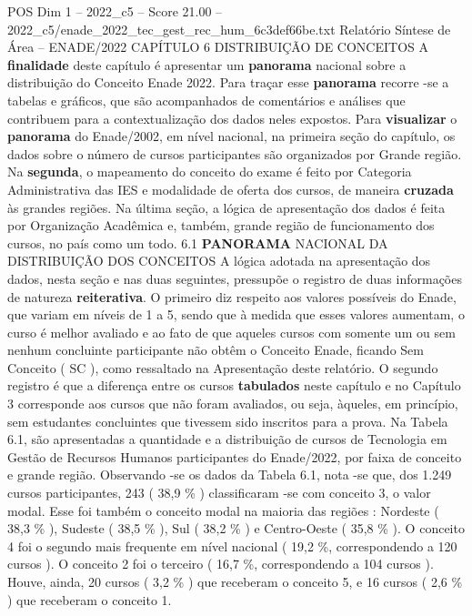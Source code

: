 \begin{textsample}{POS Dim 1 – 2022\_c5 – Score 21.00 – 2022\_c5/enade\_2022\_tec\_gest\_rec\_hum\_6c3def66be.txt}  \label{ex:f1_pos_022}
Relatório Síntese de Área – ENADE/2022 CAPÍTULO 6 DISTRIBUIÇÃO DE CONCEITOS A \textbf{finalidade} deste capítulo é apresentar um \textbf{panorama} nacional sobre a distribuição do Conceito Enade 2022.
Para traçar esse \textbf{panorama} recorre -se a tabelas e gráficos, que são acompanhados de comentários e análises que contribuem para a contextualização dos dados neles expostos.
Para \textbf{visualizar} o \textbf{panorama} do Enade/2002, em nível nacional, na primeira seção do capítulo, os dados sobre o número de cursos participantes são organizados por Grande região.
Na \textbf{segunda}, o mapeamento do conceito do exame é feito por Categoria Administrativa das IES e modalidade de oferta dos cursos, de maneira \textbf{cruzada} às grandes regiões.
Na última seção, a lógica de apresentação dos dados é feita por Organização Acadêmica e, também, grande região de funcionamento dos cursos, no país como um todo. 6.1 \textbf{PANORAMA} NACIONAL DA DISTRIBUIÇÃO DOS CONCEITOS A lógica adotada na apresentação dos dados, nesta seção e nas duas seguintes, pressupõe o registro de duas informações de natureza \textbf{reiterativa}.
O primeiro diz respeito aos valores possíveis do Enade, que variam em níveis de 1 a 5, sendo que à medida que esses valores aumentam, o curso é melhor avaliado e ao fato de que aqueles cursos com somente um ou sem nenhum concluinte participante não obtêm o Conceito Enade, ficando Sem Conceito ( SC ), como ressaltado na Apresentação deste relatório.
O segundo registro é que a diferença entre os cursos \textbf{tabulados} neste capítulo e no Capítulo 3 corresponde aos cursos que não foram avaliados, ou seja, àqueles, em princípio, sem estudantes concluintes que tivessem sido inscritos para a prova.
Na Tabela 6.1, são apresentadas a quantidade e a distribuição de cursos de Tecnologia em Gestão de Recursos Humanos participantes do Enade/2022, por faixa de conceito e grande região.
Observando -se os dados da Tabela 6.1, nota -se que, dos 1.249 cursos participantes, 243 ( 38,9 \% ) classificaram -se com conceito 3, o valor modal.
Esse foi também o conceito modal na maioria das regiões : Nordeste ( 38,3 \% ), Sudeste ( 38,5 \% ), Sul ( 38,2 \% ) e Centro-Oeste ( 35,8 \% ).
O conceito 4 foi o segundo mais frequente em nível nacional ( 19,2 \%, correspondendo a 120 cursos ).
O conceito 2 foi o terceiro ( 16,7 \%, correspondendo a 104 cursos ).
Houve, ainda, 20 cursos ( 3,2 \% ) que receberam o conceito 5, e 16 cursos ( 2,6 \% ) que receberam o conceito 1.

\end{textsample}
